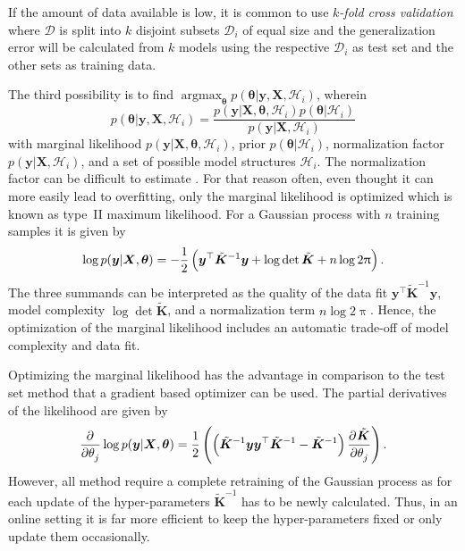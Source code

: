 \documentclass[11pt,a4paper]{scrreprt}
\newcommand{\vc}[1]{\bm{#1}}
\newcommand{\mat}[1]{\bm{#1}}
\newcommand{\T}{^{\top}}
\DeclareMathOperator*{\argmax}{argmax}
\newcommand{\newterm}[1]{\emph{#1}}
\begin{document}
If the amount of data available is low, it is common to use \newterm{$k$-fold 
    cross validation} where $\mathcal{D}$ is split into $k$ disjoint subsets 
$\mathcal{D}_i$ of equal size and the generalization error will be calculated 
from $k$ models using the respective $\mathcal{D}_i$ as test set and the other 
sets as training data.

The third possibility is to find $\argmax_{\vc \theta} p(\vc\theta | \vc y, \mat 
X, \mathcal{H}_i)$, wherein
\begin{equation}
    p(\vc\theta | \vc y, \mat X, \mathcal{H}_i) = \frac{p(\vc y | \mat X, 
        \vc\theta, \mathcal{H}_i) p(\vc\theta | \mathcal{H}_i)}{p(\vc y | \mat 
        X, \mathcal{H}_i)}
\end{equation}
with marginal likelihood $p(\vc y | \mat X, \vc\theta, \mathcal{H}_i)$, prior 
$p(\vc\theta | \mathcal{H}_i)$, normalization factor $p(\vc y | \mat X, 
\mathcal{H}_i)$, and a set of possible model structures $\mathcal{H}_i$. The 
normalization factor can be difficult to estimate 
\parencite[109]{Rasmussen:2006vz}. For that reason often, even thought it can 
more easily lead to overfitting, only the marginal likelihood is optimized which 
is known as type~II maximum likelihood. For a Gaussian process with $n$ training 
samples it is given by
\begin{equation}
    \log p(\vc y | \mat X, \vc\theta) = -\frac{1}{2}\del{\vc y\T \tilde{\mat 
            K}^{-1} \vc y + \log \det \tilde{\mat K} + n \log 2\uppi} \text{.}
\end{equation}
The three summands can be interpreted as the quality of the data fit $\vc y\T 
\tilde{\mat K}^{-1} \vc y$, model complexity $\log \det \tilde{\mat K}$, and 
a normalization term $n \log 2\uppi$. Hence, the optimization of the marginal 
likelihood includes an automatic trade-off of model complexity and data fit.

Optimizing the marginal likelihood has the advantage in comparison to the test 
set method that a gradient based optimizer can be used. The partial derivatives 
of the likelihood are given by
\begin{equation}
    \dpd{}{\theta_j} \log p(\vc y | \mat X, \vc\theta) = \frac{1}{2} 
    \del{\del{\tilde{\mat K}^{-1}\vc y \vc y\T \tilde{\mat K}^{-1} - \tilde{\mat 
                K}^{-1}} \dpd{\tilde{\mat K}}{\theta_j}} \text{.}
\end{equation}
However, all method require a complete retraining of the Gaussian process as for 
each update of the hyper-parameters $\tilde{\mat K}^{-1}$ has to be newly 
calculated. Thus, in an online setting it is far more efficient to keep the 
hyper-parameters fixed or only update them occasionally.
\end{document}
